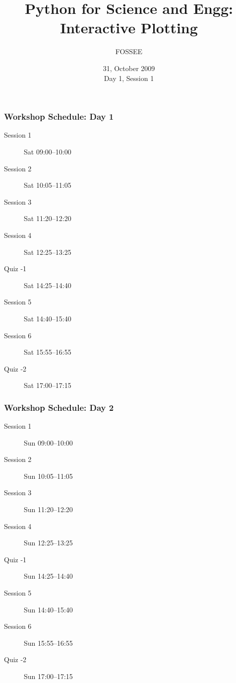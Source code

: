\documentclass[14pt,compress]{beamer}
\title[Interactive Plotting]{Python for Science and Engg: Interactive Plotting}
\author[FOSSEE] {FOSSEE}
\institute[IIT Bombay] {Department of Aerospace Engineering\\IIT Bombay}
\date[] {31, October 2009\\Day 1, Session 1}
\begin{document}
\begin{frame}
  \maketitle
\end{frame}


\begin{frame}
  \frametitle{Workshop Schedule: Day 1}
  \begin{description}
	\item[Session 1] Sat 09:00--10:00
	\item[Session 2] Sat 10:05--11:05
	\item[Session 3] Sat 11:20--12:20
	\item[Session 4] Sat 12:25--13:25
        \item[Quiz -1]   Sat 14:25--14:40
        \item[Session 5] Sat 14:40--15:40
        \item[Session 6] Sat 15:55--16:55
        \item[Quiz -2]   Sat 17:00--17:15
  \end{description}
\end{frame}

\begin{frame}
  \frametitle{Workshop Schedule: Day 2}
  \begin{description}
	\item[Session 1] Sun 09:00--10:00
	\item[Session 2] Sun 10:05--11:05
	\item[Session 3] Sun 11:20--12:20
	\item[Session 4] Sun 12:25--13:25
        \item[Quiz -1]   Sun 14:25--14:40
        \item[Session 5] Sun 14:40--15:40
        \item[Session 6] Sun 15:55--16:55
        \item[Quiz -2]   Sun 17:00--17:15
  \end{description}
\end{frame}
\end{document}
